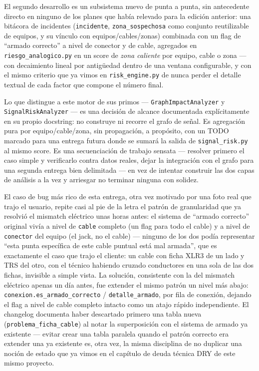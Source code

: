 \documentclass[11pt,twocolumn]{article}
\begin{document}
El segundo desarrollo es un subsistema nuevo de punta a punta, sin antecedente directo en ninguno de los planes que había relevado para la edición anterior: una bitácora de incidentes (\texttt{incidente}, \texttt{zona\_sospechosa} como conjunto reutilizable de equipos, y su vínculo con equipos/cables/zonas) combinada con un flag de ``armado correcto'' a nivel de conector y de cable, agregados en \texttt{riesgo\_analogico.py} en un score de \emph{zona caliente} por equipo, cable o zona --- con decaimiento lineal por antigüedad dentro de una ventana configurable, y con el mismo criterio que ya vimos en \texttt{risk\_engine.py} de nunca perder el detalle textual de cada factor que compone el número final.

Lo que distingue a este motor de sus primos --- \texttt{GraphImpactAnalyzer} y \texttt{SignalRiskAnalyzer} --- es una decisión de alcance documentada explícitamente en su propio docstring: no construye ni recorre el grafo de señal. Es agregación pura por equipo/cable/zona, sin propagación, a propósito, con un TODO marcado para una entrega futura donde se sumará la salida de \texttt{signal\_risk.py} al mismo score. Es una secuenciación de trabajo sensata --- resolver primero el caso simple y verificarlo contra datos reales, dejar la integración con el grafo para una segunda entrega bien delimitada --- en vez de intentar construir las dos capas de análisis a la vez y arriesgar no terminar ninguna con solidez.

El caso de bug más rico de esta entrega, otra vez motivado por una foto real que trajo el usuario, repite casi al pie de la letra el patrón de granularidad que ya resolvió el mismatch eléctrico unas horas antes: el sistema de ``armado correcto'' original vivía a nivel de \texttt{cable} completo (un flag para todo el cable) y a nivel de \texttt{conector} del equipo (el jack, no el cable) --- ninguno de los dos podía representar ``esta punta específica de este cable puntual está mal armada'', que es exactamente el caso que trajo el cliente: un cable con ficha XLR3 de un lado y TRS del otro, con el técnico habiendo cruzado conductores en una sola de las dos fichas, invisible a simple vista. La solución, consistente con la del mismatch eléctrico apenas un día antes, fue extender el mismo patrón un nivel más abajo: \texttt{conexion.es\_armado\_correcto} / \texttt{detalle\_armado}, por fila de conexión, dejando el flag a nivel de cable completo intacto como un atajo rápido independiente. El changelog documenta haber descartado primero una tabla nueva (\texttt{problema\_ficha\_cable}) al notar la superposición con el sistema de armado ya existente --- evitar crear una tabla paralela quando el patrón correcto era extender una ya existente es, otra vez, la misma disciplina de no duplicar una noción de estado que ya vimos en el capítulo de deuda técnica DRY de este mismo proyecto.
\end{document}
